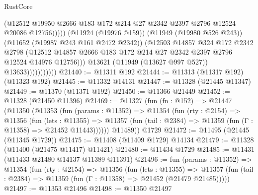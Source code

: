 \begin{lexlean}{RustCore}
\begin{coremodule}
                                    (@12512
                                      @19950
                                      @2666
                                      @183
                                      @172
                                      @214
                                      @27
                                      @2342
                                      @2397
                                      @2796
                                      @12524
                                      @20086
                                      @12756)))))
                            (@11924 (@19976 @159))
                            (@11949 (@19980 @526 @243))
                            (@11652 (@19987 @243 @161 @2472 @2342))
                            (@12503
                              @14857
                              @324
                              @172
                              @2342
                              @2798
                              (@12512
                                @14857
                                @2666
                                @183
                                @172
                                @214
                                @27
                                @2342
                                @2397
                                @2796
                                @12524
                                @14976
                                @12756)))
                          @13621
                          (@11949 (@13627 @997 @527))
                          @13633)))))))))))
@21440 := @11311 @192
@21444 := @11313 (@11317 @192) (@11323 @192)
@21445 := @11332 @14131
@21447 := @11328 (@21445 @11347)
@21449 := @11370 (@11371 @192)
@21450 := @11366 @21449
@21452 := @11328 (@21450 @11396)
@21469 := @11327
    (fun (fn : @152) =>
    @21447
      (@11350
        (@11353
          (fun (params : @11352) =>
          @11354
            (fun (rty : @2154) =>
            @11356
              (fun (lets : @11355) =>
              @11357 (fun (tail : @2384) => @11359 (fun (Γ : @11358) => @21452 @11443))))))
        @11489))
    @1729
@21472 := @11495 (@21445 (@11345 @1729))
@21475 := @11408 (@11409 @1729) @14134
@21479 := @11328 (@11400 (@21475 @11417) @11421)
@21480 := @11434 @1729
@21485 := @11431 (@11433 @21480 @14137 @11389 @11391)
@21496 := fun (params : @11352) =>
  @11354
    (fun (rty : @2154) =>
    @11356
      (fun (lets : @11355) =>
      @11357 (fun (tail : @2384) => @11359 (fun (Γ : @11358) => @21452 (@21479 @21485)))))
@21497 := @11353 @21496
@21498 := @11350 @21497

\end{coremodule}
\end{lexlean}
